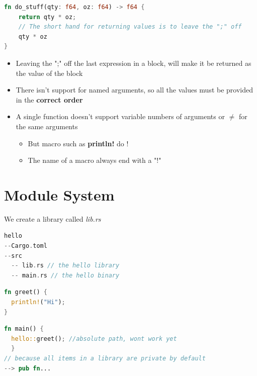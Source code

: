 \documentclass{report}
\begin{document}
\begin{multicols*}{2}
\begin{tcolorbox}[colback=backcolour,size=small,left=4mm]
\begin{lstlisting}[language=rust]
fn do_stuff(qty: f64, oz: f64) -> f64 {
	return qty * oz;
	// The short hand for returning values is to leave the ";" off
	qty * oz
}
\end{lstlisting}
\end{tcolorbox}

\begin{itemize}
	\item Leaving the ";" off the last expression in a block, will make it be returned as the value of the block
	\item There isn't support for named arguments, so all the values must be provided in the \textbf{correct order}
	\item A single function doesn't support variable numbers of arguments or $\not =$ for the same arguments
		\begin{itemize} 
			\item But macro such as \textbf{println!} do ! 
			\item The name of a macro always end with a "!"
		\end{itemize}
\end{itemize}

\section{Module System}

We create a library called \textit{lib.rs} 

\begin{tcolorbox}[title=,colback=backcolour,size=small,left=4mm]
\begin{lstlisting}[language=rust]
hello
--Cargo.toml
--src
  -- lib.rs // the hello library
  -- main.rs // the hello binary
\end{lstlisting}
\end{tcolorbox}

\begin{tcolorbox}[title=In lib.rs,colback=backcolour,size=small,left=4mm]
\begin{lstlisting}[language=rust]
fn greet() {
  println!("Hi");
}
\end{lstlisting}
\end{tcolorbox}

\begin{tcolorbox}[title=To call it in main.rs,colback=backcolour,size=small,left=4mm]
\begin{lstlisting}[language=rust]
fn main() {
  hello::greet(); //absolute path, wont work yet
  }
// because all items in a library are private by default
--> pub fn...
\end{lstlisting}
\end{tcolorbox}


\end{multicols*}
\end{document}

